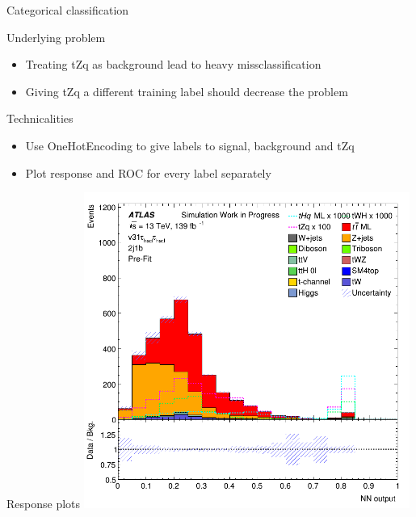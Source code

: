 \begin{frame}{Categorical classification}
    \begin{block}{Underlying problem}
        \begin{itemize}
            \item Treating tZq as background lead to heavy missclassification
            \item Giving tZq a different training label should decrease the problem
        \end{itemize}
    \end{block}
    \begin{block}{Technicalities}
        \begin{itemize}
            \item Use OneHotEncoding to give labels to signal, background and tZq
            \item Plot response and ROC for every label separately
        \end{itemize}
    \end{block}
\end{frame}

\begin{frame}{Response plots}
    \includegraphics[width=0.8\textwidth]{lephad_cat.png}
\end{frame}